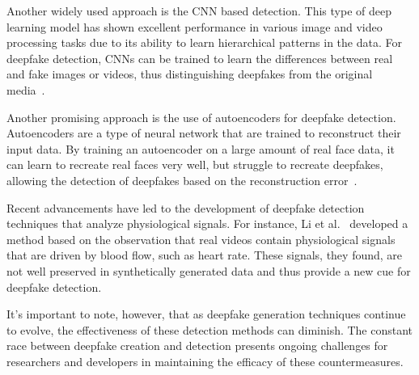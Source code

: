 Another widely used approach is the \ac{CNN} based detection. This type of deep
learning model has shown excellent performance in various image and video
processing tasks due to its ability to learn hierarchical patterns in the data.
For deepfake detection, \ac{CNN}s can be trained to learn the differences between
real and fake images or videos, thus distinguishing deepfakes from the original
media~\cite{nguyen2018capsuleforensics}.

Another promising approach is the use of autoencoders for deepfake detection.
Autoencoders are a type of neural network that are trained to reconstruct
their input data. By training an autoencoder on a large amount of real face
data, it can learn to recreate real faces very well, but struggle to recreate
deepfakes, allowing the detection of deepfakes based on the reconstruction
error~\cite{cozzolino2017recasting}.

Recent advancements have led to the development of deepfake detection techniques
that analyze physiological signals. For instance, Li et al.~\cite{li2018ictu}
developed a method based on the observation that real videos contain physiological
signals that are driven by blood flow, such as heart rate. These signals, they
found, are not well preserved in synthetically generated data and thus provide
a new cue for deepfake detection.

It's important to note, however, that as deepfake generation techniques
continue to evolve, the effectiveness of these detection methods can diminish.
The constant race between deepfake creation and detection presents ongoing
challenges for researchers and developers in maintaining the efficacy of these
countermeasures.